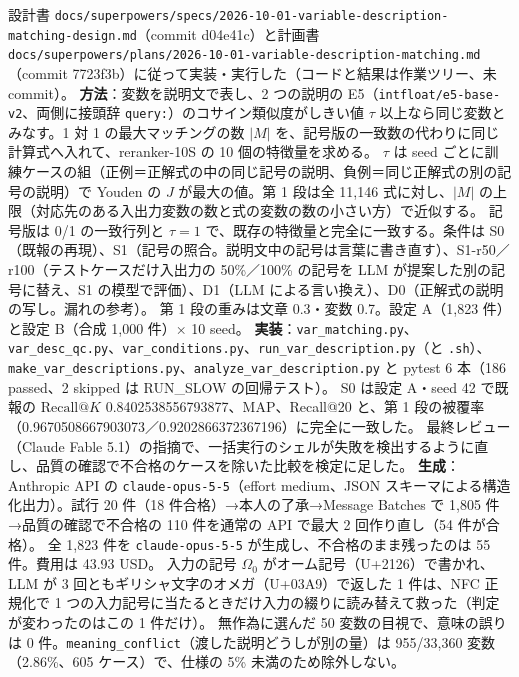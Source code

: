 \documentclass[11pt,a4paper]{jsarticle}
\begin{document}
\begin{itemize}[nosep]
    設計書 \texttt{docs/superpowers/specs/2026-10-01-variable-description-matching-design.md}（commit d04e41c）と計画書 \texttt{docs/superpowers/plans/2026-10-01-variable-description-matching.md}（commit 7723f3b）に従って実装・実行した（コードと結果は作業ツリー、未 commit）。
    \textbf{方法}：変数を説明文で表し、2 つの説明の E5（\texttt{intfloat/e5-base-v2}、両側に接頭辞 \texttt{query:}）のコサイン類似度がしきい値 $\tau$ 以上なら同じ変数とみなす。1 対 1 の最大マッチングの数 $|M|$ を、記号版の一致数の代わりに同じ計算式へ入れて、reranker-10S の 10 個の特徴量を求める。
    $\tau$ は seed ごとに訓練ケースの組（正例＝正解式の中の同じ記号の説明、負例＝同じ正解式の別の記号の説明）で Youden の $J$ が最大の値。第 1 段は全 11{,}146 式に対し、$|M|$ の上限（対応先のある入出力変数の数と式の変数の数の小さい方）で近似する。
    記号版は 0/1 の一致行列と $\tau=1$ で、既存の特徴量と完全に一致する。条件は S0（既報の再現）、S1（記号の照合。説明文中の記号は言葉に書き直す）、S1-r50／r100（テストケースだけ入出力の 50\%／100\% の記号を LLM が提案した別の記号に替え、S1 の模型で評価）、D1（LLM による言い換え）、D0（正解式の説明の写し。漏れの参考）。
    第 1 段の重みは文章 0.3・変数 0.7。設定 A（1{,}823 件）と設定 B（合成 1{,}000 件）× 10 seed。
    \textbf{実装}：\texttt{var\_matching.py}、\texttt{var\_desc\_qc.py}、\texttt{var\_conditions.py}、\texttt{run\_var\_description.py}（と \texttt{.sh}）、\texttt{make\_var\_descriptions.py}、\texttt{analyze\_var\_description.py} と pytest 6 本（186 passed、2 skipped は RUN\_SLOW の回帰テスト）。
    S0 は設定 A・seed 42 で既報の $\textrm{Recall@}K$ 0.8402538556793877、MAP、Recall@20 と、第 1 段の被覆率（0.9670508667903073／0.9202866372367196）に完全に一致した。
    最終レビュー（Claude Fable 5.1）の指摘で、一括実行のシェルが失敗を検出するように直し、品質の確認で不合格のケースを除いた比較を検定に足した。
    \textbf{生成}：Anthropic API の \texttt{claude-opus-5-5}（effort medium、JSON スキーマによる構造化出力）。試行 20 件（18 件合格）→本人の了承→Message Batches で 1{,}805 件→品質の確認で不合格の 110 件を通常の API で最大 2 回作り直し（54 件が合格）。
    全 1{,}823 件を \texttt{claude-opus-5-5} が生成し、不合格のまま残ったのは 55 件。費用は 43.93 USD。
    入力の記号 $\Omega_{0}$ がオーム記号（U+2126）で書かれ、LLM が 3 回ともギリシャ文字のオメガ（U+03A9）で返した 1 件は、NFC 正規化で 1 つの入力記号に当たるときだけ入力の綴りに読み替えて救った（判定が変わったのはこの 1 件だけ）。
    無作為に選んだ 50 変数の目視で、意味の誤りは 0 件。\texttt{meaning\_conflict}（渡した説明どうしが別の量）は 955/33{,}360 変数（2.86\%、605 ケース）で、仕様の 5\% 未満のため除外しない。

\end{itemize}
\end{document}
